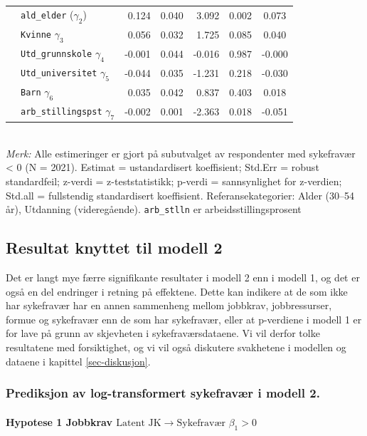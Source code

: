 \documentclass[
  12pt,
  a4paper,
  DIV=11,
  numbers=noendperiod]{scrartcl}
\let\oldparagraph\paragraph
\renewcommand{\paragraph}[1]{\oldparagraph{#1}\mbox{}}
\begin{document}
\begin{table}[htbp]
\begin{tabular}{@{}llrrrrc@{}}
& \texttt{ald\_elder} ($\gamma_2$)        & 0.124 & 0.040 & 3.092  & 0.002  & 0.073 \\
& \texttt{Kvinne} $\gamma_3$            & 0.056 & 0.032 & 1.725  & 0.085  & 0.040 \\
& \texttt{Utd\_grunnskole} $\gamma_4$   & -0.001& 0.044 & -0.016 & 0.987  & -0.000 \\
& \texttt{Utd\_universitet} $\gamma_5$  & -0.044& 0.035 & -1.231 & 0.218  & -0.030 \\
& \texttt{Barn} $\gamma_6$              & 0.035 & 0.042 & 0.837  & 0.403  & 0.018 \\
& \texttt{arb\_stillingspst} $\gamma_7$ & -0.002& 0.001 & -2.363 & 0.018  & -0.051 \\
\bottomrule
\end{tabular}
\raggedright
\footnotesize{\\ 
\textit{Merk:} Alle estimeringer er gjort på subutvalget av respondenter med sykefravær < 0 (N = 2021). Estimat = ustandardisert koeffisient; Std.Err = robust standardfeil; z-verdi = z-teststatistikk; p-verdi = sannsynlighet for z-verdien; Std.all = fullstendig standardisert koeffisient. Referansekategorier: Alder (30–54 år), Utdanning (videregående). \texttt{arb\_stlln} er arbeidsstillingsprosent}
\end{table}

\subsection{Resultat knyttet til modell
2}\label{resultat-knyttet-til-modell-2-1}

Det er langt mye færre signifikante resultater i modell 2 enn i modell
1, og det er også en del endringer i retning på effektene. Dette kan
indikere at de som ikke har sykefravær har en annen sammenheng mellom
jobbkrav, jobbressurser, formue og sykefravær enn de som har sykefravær,
eller at p-verdiene i modell 1 er for lave på grunn av skjevheten i
sykefraværsdataene. Vi vil derfor tolke resultatene med forsiktighet, og
vi vil også diskutere svakhetene i modellen og dataene i kapittel
\ref{sec-diskusjon}.

\subsubsection{Prediksjon av log-transformert sykefravær i modell
2.}\label{prediksjon-av-log-transformert-sykefravuxe6r-i-modell-2.}

\paragraph{\texorpdfstring{Hypotese 1 Jobbkrav
\(\text{Latent JK} \rightarrow \text{Sykefravær } \beta_1 > 0\)}{Hypotese 1 Jobbkrav \textbackslash text\{Latent JK\} \textbackslash rightarrow \textbackslash text\{Sykefravær \} \textbackslash beta\_1 \textgreater{} 0}}\label{hypotese-1-jobbkrav-textlatent-jk-rightarrow-textsykefravuxe6r-beta_1-0-1}
\end{document}
